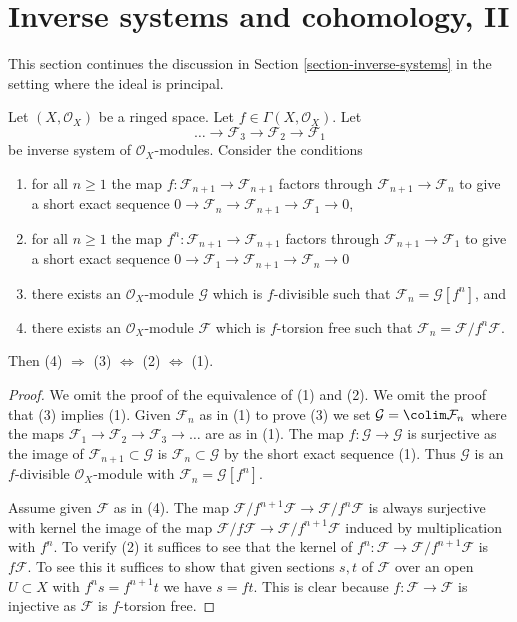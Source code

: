 \section{Inverse systems and cohomology, II}
\label{section-inverse-systems-bis}

\noindent
This section continues the discussion in
Section \ref{section-inverse-systems}
in the setting where the ideal is principal.

\begin{lemma}
\label{lemma-equivalent-f-good}
Let $(X, \mathcal{O}_X)$ be a ringed space.
Let $f \in \Gamma(X, \mathcal{O}_X)$. Let
$$
\ldots \to \mathcal{F}_3 \to \mathcal{F}_2 \to \mathcal{F}_1
$$
be inverse system of $\mathcal{O}_X$-modules. Consider the conditions
\begin{enumerate}
\item for all $n \geq 1$ the map
$f : \mathcal{F}_{n + 1} \to \mathcal{F}_{n + 1}$ factors
through $\mathcal{F}_{n + 1} \to \mathcal{F}_n$ to give a
short exact sequence
$0 \to \mathcal{F}_n \to \mathcal{F}_{n + 1} \to \mathcal{F}_1 \to 0$,
\item for all $n \geq 1$ the map
$f^n : \mathcal{F}_{n + 1} \to \mathcal{F}_{n + 1}$
factors through $\mathcal{F}_{n + 1} \to \mathcal{F}_1$
to give a short exact sequence
$0 \to \mathcal{F}_1 \to \mathcal{F}_{n + 1} \to \mathcal{F}_n \to 0$
\item there exists an $\mathcal{O}_X$-module $\mathcal{G}$
which is $f$-divisible such that $\mathcal{F}_n = \mathcal{G}[f^n]$, and
\item there exists an $\mathcal{O}_X$-module $\mathcal{F}$
which is $f$-torsion free such that
$\mathcal{F}_n = \mathcal{F}/f^n\mathcal{F}$.
\end{enumerate}
Then (4) $\Rightarrow$ (3) $\Leftrightarrow$ (2) $\Leftrightarrow$ (1).
\end{lemma}

\begin{proof}
We omit the proof of the equivalence of (1) and (2). We omit the proof
that (3) implies (1). Given $\mathcal{F}_n$ as in (1) to prove (3) we set
$\mathcal{G} = \colim \mathcal{F}_n$ where the maps
$\mathcal{F}_1 \to \mathcal{F}_2 \to \mathcal{F}_3 \to \ldots$
are as in (1). The map $f : \mathcal{G} \to \mathcal{G}$
is surjective as the image of $\mathcal{F}_{n + 1} \subset \mathcal{G}$
is $\mathcal{F}_n \subset \mathcal{G}$ by the short exact sequence (1).
Thus $\mathcal{G}$ is an $f$-divisible $\mathcal{O}_X$-module
with $\mathcal{F}_n = \mathcal{G}[f^n]$.

\medskip\noindent
Assume given $\mathcal{F}$ as in (4). The map
$\mathcal{F}/f^{n + 1}\mathcal{F} \to \mathcal{F}/f^n\mathcal{F}$
is always surjective with kernel the image of the map
$\mathcal{F}/f\mathcal{F} \to \mathcal{F}/f^{n + 1}\mathcal{F}$
induced by multiplication with $f^n$. To verify (2)
it suffices to see that the kernel of
$f^n : \mathcal{F} \to \mathcal{F}/f^{n + 1}\mathcal{F}$
is $f\mathcal{F}$. To see this it suffices to show that given
sections $s, t$ of $\mathcal{F}$ over an open $U \subset X$
with $f^ns = f^{n + 1}t$ we have $s = ft$. This is clear because
$f : \mathcal{F} \to \mathcal{F}$ is injective as $\mathcal{F}$
is $f$-torsion free.
\end{proof}

